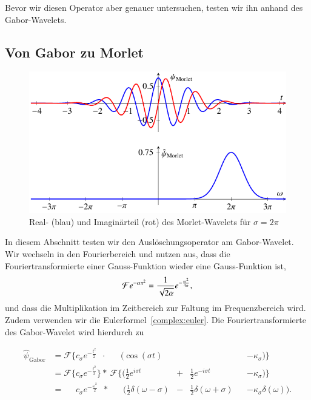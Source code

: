 Bevor wir diesen Operator aber genauer untersuchen, testen wir ihn anhand des Gabor-Wavelets.

\subsection{Von Gabor zu Morlet}
\label{complex:gabor-to-morlet}

\begin{figure}
	\centering
	\includegraphics{papers/complex/images/morlet.pdf}
	\caption{Real- (blau) und Imaginärteil (rot) des Morlet-Wavelets für $\sigma = 2\pi$ \label{complex:morlet}}
\end{figure}

In diesem Abschnitt testen wir den Auslöschungsoperator am Gabor-Wavelet.
Wir wechseln in den Fourierbereich und nutzen aus, dass die Fouriertransformierte einer Gauss-Funktion wieder eine Gauss-Funktion ist,
\[
	\Four e^{-\alpha x^2} 
	= \frac{1}{\sqrt{2\alpha}}e^{- \frac{\omega^2}{4\alpha}},
\]
und dass die Multiplikation im Zeitbereich zur Faltung im Frequenzbereich wird.
Zudem verwenden wir die Eulerformel~\eqref{complex:euler}.
Die Fouriertransformierte des Gabor-Wavelet wird hierdurch zu

\begin{equation*}
\begin{aligned}
 \hat{\psi}_\text{Gabor}
 & = \mathcal{F}\Bigg\lbrace c_\sigma e^{-\frac{t^2}{2}}\phantom{\Bigg\rbrace}
 \cdot\; \phantom{\mathcal{F}\Bigg\lbrace}
 \Bigg(\cos\left(\sigma t\right) &&
 &&- \kappa_\sigma\Bigg) \Bigg\rbrace \\
 & = \mathcal{F}\Bigg\lbrace c_\sigma e^{-\frac{t^2}{2}} \Bigg\rbrace 
 *\: \mathcal{F}\Bigg\lbrace\Bigg( \frac12 e^{i\sigma t} &+& \frac12 e^{-i\sigma t}
 &&- \kappa_\sigma \Bigg)\Bigg\rbrace\\
 & = \phantom{\mathcal{F}\Bigg\lbrace} c_\sigma e^{- \frac{\omega^2}{2}} \phantom{\Big\rbrace}
 *\:\phantom{\mathcal{F}\Bigg\lbrace} \Bigg(
  \frac{1}{2}\delta(\omega - \sigma) &-&
  \frac{1}{2}\delta(\omega + \sigma) 
 && - \kappa_\sigma\delta(\omega)
  \Bigg).
\end{aligned}
\end{equation*}

